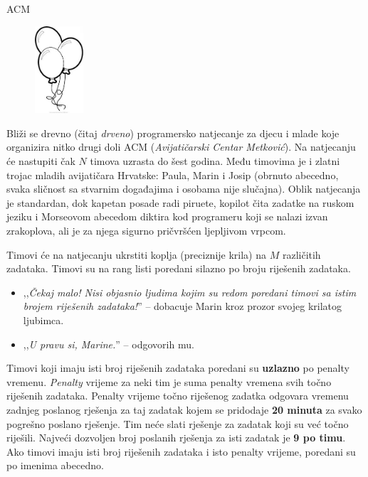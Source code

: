 \begin{statement}[
  problempoints=50,
  timelimit=1 sekunda,
  memorylimit=512 MiB,
]{ACM}

\setlength\intextsep{-0.1cm}
\begin{figure}
\centering
\includegraphics[width=0.16\textwidth]{img/balloon.jpeg}
\end{figure}

Bliži se drevno (čitaj \textit{drveno}) programersko natjecanje za djecu i
mlade koje organizira nitko drugi doli ACM (\textit{Avijatičarski Centar Metković}).
Na natjecanju će nastupiti čak $N$ timova uzrasta do šest godina. Među timovima
je i zlatni trojac mladih avijatičara Hrvatske: Paula, Marin i Josip (obrnuto
abecedno, svaka sličnost sa stvarnim događajima i osobama nije slučajna).
Oblik natjecanja je standardan, dok kapetan posade radi piruete, kopilot čita
zadatke na ruskom jeziku i Morseovom abecedom diktira kod programeru koji se
nalazi izvan zrakoplova, ali je za njega sigurno pričvršćen ljepljivom vrpcom.

Timovi će na natjecanju ukrstiti koplja (preciznije krila) na $M$ različitih
zadataka. Timovi su na rang listi poredani silazno po broju riješenih
zadataka.

\begin{itemize}[topsep=0pt]
\item ,,\textit{Čekaj malo! Nisi objasnio ljudima kojim su redom poredani
timovi sa istim brojem riješenih zadataka!}'' -- dobacuje Marin kroz prozor
svojeg krilatog ljubimca.
\item ,,\textit{U pravu si, Marine.}'' -- odgovorih mu.
\end{itemize}

Timovi koji imaju isti broj riješenih zadataka poredani su \textbf{uzlazno} po
penalty vremenu. \textit{Penalty} vrijeme za neki tim je suma penalty vremena
svih točno riješenih zadataka. Penalty vrijeme točno riješenog zadatka
odgovara vremenu zadnjeg poslanog rješenja za taj zadatak kojem se pridodaje
\textbf{20 minuta} za svako pogrešno poslano rješenje.  Tim neće slati
rješenje za zadatak koji su već točno riješili. Najveći dozvoljen broj
poslanih rješenja za isti zadatak je \textbf{9 po timu}. Ako timovi imaju
isti broj riješenih zadataka i isto penalty vrijeme, poredani su po imenima
abecedno.


\end{statement}
